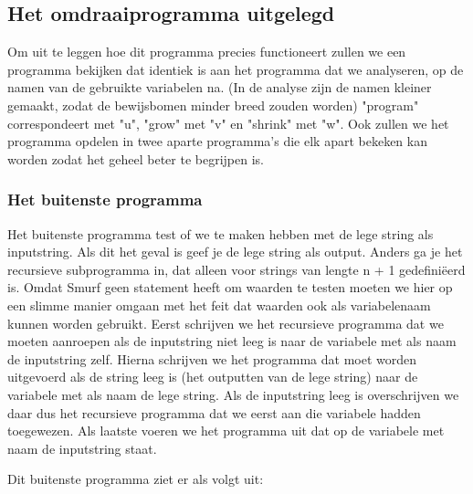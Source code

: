 \subsection{Het omdraaiprogramma uitgelegd}
\label{sec:uitleg programma}

Om uit te leggen hoe dit programma precies functioneert zullen we een programma bekijken dat identiek is aan het programma dat we analyseren, op de namen van de gebruikte variabelen na. (In de analyse zijn de namen kleiner gemaakt, zodat de bewijsbomen minder breed zouden worden)
"program" correspondeert met "u",
"grow" met "v" en 
"shrink" met "w".
Ook zullen we het programma opdelen in twee aparte programma's die elk apart bekeken kan worden zodat het geheel beter te begrijpen is.
\medskip

\subsubsection{Het buitenste programma}
Het buitenste programma test of we te maken hebben met de lege string als inputstring. Als dit het geval is geef je de lege string als output. Anders ga je het recursieve subprogramma in, dat alleen voor strings van lengte n + 1 gedefiniëerd is.
Omdat Smurf geen statement heeft om waarden te testen moeten we hier op een slimme manier omgaan met het feit dat waarden ook als variabelenaam kunnen worden gebruikt. Eerst schrijven we het recursieve programma dat we moeten aanroepen als de inputstring niet leeg is naar de variabele met als naam de inputstring zelf. Hierna schrijven we het programma dat moet worden uitgevoerd als de string leeg is (het outputten van de lege string) naar de variabele met als naam de lege string. Als de inputstring leeg is overschrijven we daar dus het recursieve programma dat we eerst aan die variabele hadden toegewezen. Als laatste voeren we het programma uit dat op de variabele met naam de inputstring staat.

Dit buitenste programma ziet er als volgt uit:
\begin{center}
\end{center}

